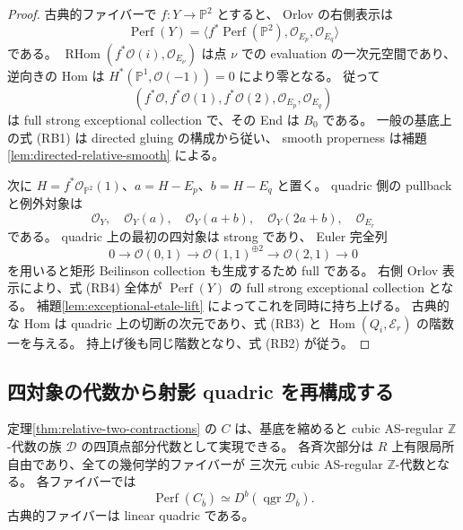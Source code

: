\begin{proof}
古典的ファイバーで $f:Y\to\mathbb P^2$ とすると、
Orlov の右側表示は
\[
 \operatorname{Perf}(Y)
 =\langle f^*\operatorname{Perf}(\mathbb P^2),
          \mathcal O_{E_p},\mathcal O_{E_q}\rangle
\]
である。
$\operatorname{RHom}(f^*\mathcal O(i),\mathcal O_{E_\nu})$
は点 $\nu$ での evaluation の一次元空間であり、
逆向きの Hom は $H^*(\mathbb P^1,\mathcal O(-1))=0$ により零となる。
従って
\[
 (f^*\mathcal O,f^*\mathcal O(1),f^*\mathcal O(2),
       \mathcal O_{E_p},\mathcal O_{E_q})
\]
は full strong exceptional collection で、その End は $B_0$ である。
一般の基底上の式 (RB1) は directed gluing の構成から従い、
smooth properness は補題\ref{lem:directed-relative-smooth} による。

次に $H=f^*\mathcal O_{\mathbb P^2}(1)$、$a=H-E_p$、$b=H-E_q$ と置く。
quadric 側の pullback と例外対象は
\[
 \mathcal O_Y,\quad\mathcal O_Y(a),\quad\mathcal O_Y(a+b),\quad
 \mathcal O_Y(2a+b),\quad\mathcal O_{E_r}
 \label{eq:relative-classical-collection}\tag{RB4}
\]
である。
quadric 上の最初の四対象は strong であり、
Euler 完全列
\[
 0\longrightarrow\mathcal O(0,1)
 \longrightarrow\mathcal O(1,1)^{\oplus2}
 \longrightarrow\mathcal O(2,1)\longrightarrow0
\]
を用いると矩形 Beilinson collection も生成するため full である。
右側 Orlov 表示により、式 (RB4) 全体が $\operatorname{Perf}(Y)$ の
full strong exceptional collection となる。
補題\ref{lem:exceptional-etale-lift} によってこれを同時に持ち上げる。
古典的な Hom は quadric 上の切断の次元であり、式 (RB3) と
$\operatorname{Hom}(Q_i,\mathcal E_r)$ の階数一を与える。
持上げ後も同じ階数となり、式 (RB2) が従う。
\end{proof}

\subsection{四対象の代数から射影 quadric を再構成する}

\begin{proposition}\label{prop:relative-quadric-reconstruction}
定理\ref{thm:relative-two-contractions} の $C$ は、基底を縮めると
cubic AS-regular $\mathbb Z$-代数の族 $\mathcal D$ の四頂点部分代数として実現できる。
各斉次部分は $R$ 上有限局所自由であり、全ての幾何学的ファイバーが
三次元 cubic AS-regular $\mathbb Z$-代数となる。
各ファイバーでは
\[
 \operatorname{Perf}(C_{\bar b})
 \simeq D^b(\operatorname{qgr}\mathcal D_{\bar b}).
\]
古典的ファイバーは linear quadric である。
\end{proposition}

